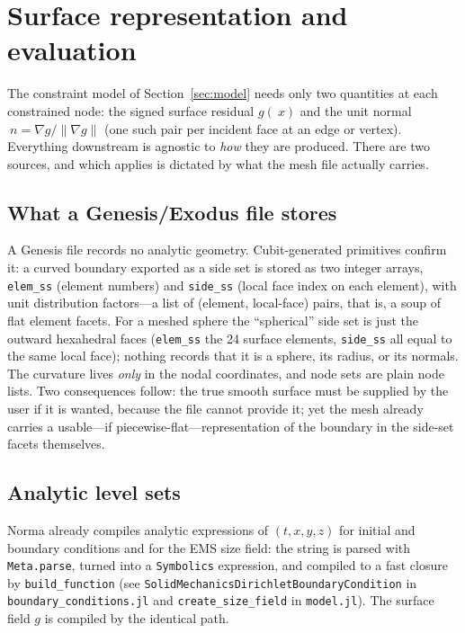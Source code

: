 \documentclass[11pt]{article}
\newcommand{\grad}{\nabla}
\newcommand{\norm}[1]{\lVert #1 \rVert}
\newcommand{\code}[1]{\texttt{#1}}
\begin{document}
\section{Surface representation and evaluation}
\label{sec:input}

The constraint model of Section~\ref{sec:model} needs only two quantities at
each constrained node: the signed surface residual $g(~x)$ and the unit normal
$~n=\grad g/\norm{\grad g}$ (one such pair per incident face at an edge or
vertex). Everything downstream is agnostic to \emph{how} they are produced.
There are two sources, and which applies is dictated by what the mesh file
actually carries.

\subsection{What a Genesis/Exodus file stores}
\label{sec:genesis}

A Genesis file records no analytic geometry. Cubit-generated primitives confirm
it: a curved boundary exported as a side set is stored as two integer arrays,
\code{elem\_ss} (element numbers) and \code{side\_ss} (local face index on each
element), with unit distribution factors---a list of (element, local-face)
pairs, that is, a soup of flat element facets. For a meshed sphere the
``spherical'' side set is just the outward hexahedral faces (\code{elem\_ss} the
24 surface elements, \code{side\_ss} all equal to the same local face); nothing
records that it is a sphere, its radius, or its normals. The curvature lives
\emph{only} in the nodal coordinates, and node sets are plain node lists. Two
consequences follow: the true smooth surface must be supplied by the user if it
is wanted, because the file cannot provide it; yet the mesh already carries a
usable---if piecewise-flat---representation of the boundary in the side-set
facets themselves.

\subsection{Analytic level sets}
\label{sec:analytic}

Norma already compiles analytic expressions of $(t,x,y,z)$ for initial and
boundary conditions and for the EMS size field: the string is parsed with
\code{Meta.parse}, turned into a \code{Symbolics} expression, and compiled to a
fast closure by \code{build\_function} (see
\code{SolidMechanicsDirichletBoundaryCondition} in \code{boundary\_conditions.jl}
and \code{create\_size\_field} in \code{model.jl}). The surface field $g$ is
compiled by the identical path.
\end{document}

